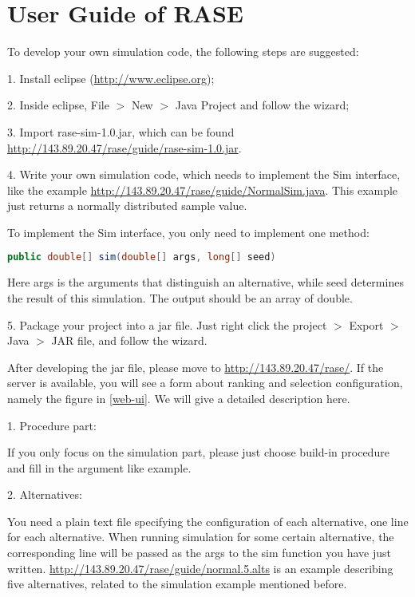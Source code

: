 \chapter{User Guide of RASE}

To develop your own simulation code, the following steps are suggested:

1.	Install eclipse (\url{http://www.eclipse.org});

2.	Inside eclipse, File $>$ New $>$ Java Project and follow the wizard;

3.	Import rase-sim-1.0.jar, which can be found \url{http://143.89.20.47/rase/guide/rase-sim-1.0.jar}.

4.	Write your own simulation code, which needs to implement the Sim interface, like the example \url{http://143.89.20.47/rase/guide/NormalSim.java}. This example just returns a normally distributed sample value.

To implement the Sim interface, you only need to implement one method:

\begin{lstlisting}[language=Java]
public double[] sim(double[] args, long[] seed)
\end{lstlisting}

Here args is the arguments that distinguish an alternative, while seed determines the result of this simulation. The output should be an array of double.

5.	Package your project into a jar file. Just right click the project $>$ Export $>$ Java $>$ JAR file, and follow the wizard.

After developing the jar file, please move to \url{http://143.89.20.47/rase/}. If the server is available, you will see a form about ranking and selection configuration, namely the figure in \ref{web-ui}. We will give a detailed description here.

1.	Procedure part:

If you only focus on the simulation part, please just choose build-in procedure and fill in the argument like example.

2.	Alternatives:

You need a plain text file specifying the configuration of each alternative, one line for each alternative. When running simulation for some certain alternative, the corresponding line will be passed as the args to the sim function you have just written. \url{http://143.89.20.47/rase/guide/normal.5.alts} is an example describing five alternatives, related to the simulation example mentioned before.

